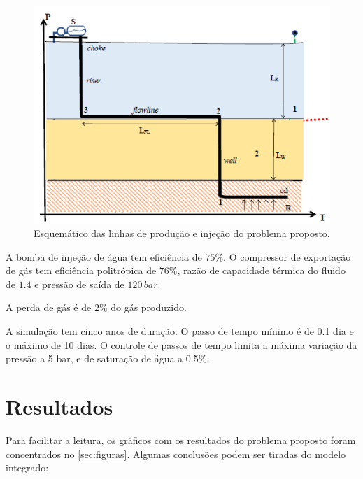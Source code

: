 \documentclass[final,5p]{elsarticle}
\numberwithin{equation}{section}
\begin{document}
        \begin{figure}
            \centering
            \includegraphics[width=0.9\linewidth]{flow_problem.png}
            \caption{Esquemático das linhas de produção e injeção do problema proposto.}
            \label{fig:desenhoflow}
        \end{figure}

        A bomba de injeção de água tem eficiência de $75\%$. O compressor de exportação de gás tem eficiência politrópica de $76\%$, razão de capacidade térmica do fluido de $1.4$ e pressão de saída de $120\,bar$.

        A perda de gás é de $2\%$ do gás produzido.

        A simulação tem cinco anos de duração. O passo de tempo mínimo é de 0.1 dia e o máximo de 10 dias. O controle de passos de tempo limita a máxima variação da pressão a 5 bar, e de saturação de água a 0.5\%.

    \section{Resultados}

        Para facilitar a leitura, os gráficos com os resultados do problema proposto foram concentrados no \ref{sec:figuras}.
        Algumas conclusões podem ser tiradas do modelo integrado:
\end{document}
